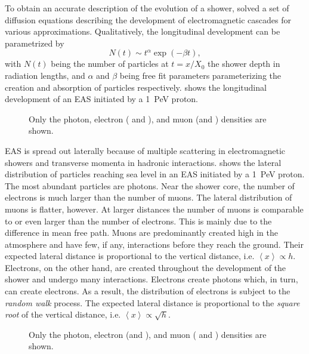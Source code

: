 To obtain an accurate description of the evolution of a shower,
\textcite{Rossi:1941} solved a set of diffusion equations describing the
development of electromagnetic cascades for various approximations.
Qualitatively, the longitudinal development can be parametrized by
\cite[157]{Grupen:2005}
\begin{equation}
N(t) \sim t^\alpha \exp(-\beta t),
\end{equation}
with $N(t)$ being the number of particles at $t = x / X_0$ the shower depth in
radiation lengths, and $\alpha$ and $\beta$ being free fit parameters parameterizing
the creation and absorption of particles respectively.
 shows the longitudinal development of an
EAS initiated by a \SI{1}{\peta\electronvolt} proton.
\begin{figure}
\centering

\caption{  Only the photon, electron (\Pelectron
and \Ppositron{\unsansmath$^+$}), and muon (\Pmuon and
\APmuon{\unsansmath$^+$}) densities are shown.}
\label{fig:longitudinal_distribution}
\end{figure}

EAS is spread out laterally because of multiple scattering in
electromagnetic showers and transverse momenta in hadronic interactions.
 shows the lateral distribution of particles
reaching sea level in an EAS initiated by a \SI{1}{\peta\electronvolt} proton.
The most abundant particles are photons.  Near the shower core, the number of
electrons is much larger than the number of muons.  The lateral distribution of
muons is flatter, however.  At larger distances the number of muons is
comparable to or even larger than the number of electrons.  This is mainly due to
the difference in mean free path.  Muons are predominantly created high in the
atmosphere and have few, if any, interactions before they reach the ground.
Their expected lateral distance is proportional to the vertical
distance, i.e. $\left<x\right> \propto h$.  Electrons, on the other hand, are
created throughout the development of the shower and undergo many interactions.
Electrons create photons which, in turn, can create electrons.  As a result, the
distribution of electrons is subject to the \emph{random walk} process.  The
expected lateral distance is proportional to the \emph{square root} of the
vertical distance, i.e. $\left<x\right> \propto \sqrt{h}$.

\begin{figure}
\centering

\caption{  Only the photon,
electron (\Pelectron and \Ppositron{\unsansmath$^+$}), and muon (\Pmuon
and \APmuon{\unsansmath$^+$})
densities are shown.}
\label{fig:lateral_distribution}
\end{figure}

